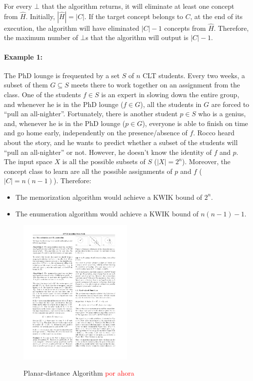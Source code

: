 For every $\bot$ that the algorithm returns, it will eliminate at least one
concept from $\hat{H}$. Initially, $|\hat{H}| = |C|$. If the target
concept belongs to $C$, at the end of its execution, the algorithm will have
eliminated $|C| - 1$ concepts from $\hat{H}$. Therefore, the maximum number
of $\bot$s that the algorithm will output is $|C| - 1$.

\paragraph{Example 1:} The PhD lounge is frequented by a set $S$ of $n$ CLT
students. Every two weeks, a subset of them $G \subseteq S$ meets there to work
together on an assignment from the class. One of the students $f \in S$ is an
expert in slowing down the entire group, and whenever he is in the PhD lounge
($f \in G$), all the students in $G$ are forced to ``pull an all-nighter''.
Fortunately, there is another student $p \in S$ who is a genius, and, whenever
he is in the PhD lounge ($p \in G$), everyone is able to finish on time and go
home early, independently on the presence/absence of $f$. Rocco heard about the
story, and he wants to predict whether a subset of the students will ``pull an
all-nighter'' or not. However, he doesn't know the identity of $f$ and $p$. \\

The input space $X$ is all the possible subsets of $S$ ($|X| = 2^n$). Moreover,
the concept class to learn are all the possible assignments of $p$ and $f$
($|C| = n(n - 1)$). Therefore:
\begin{itemize}
  \item The memorization algorithm would achieve a KWIK bound of $2^n$.
  \item The enumeration algorithm would achieve a KWIK bound of $n(n - 1) - 1$.
\end{itemize}

\begin{figure}
  \centering
  \includegraphics[width=0.5\textwidth]{figures/algorithm3.pdf}
  \label{fig:sec4.1}
  \caption{Planar-distance Algorithm \textcolor{red}{por ahora}}
\end{figure}

